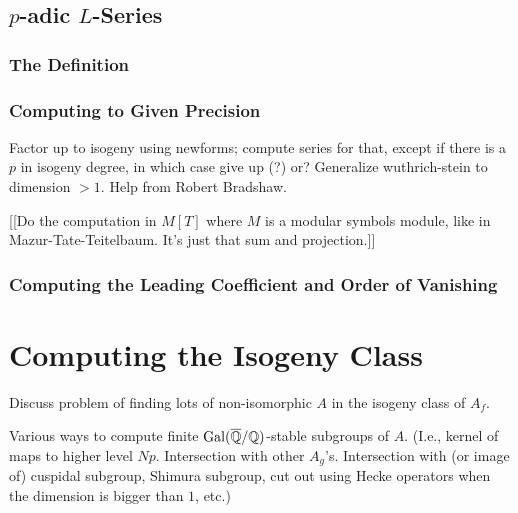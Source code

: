 \documentclass{article}
\begin{document}
\subsection{$p$-adic $L$-Series}


\subsubsection{The Definition}

\subsubsection{Computing to Given Precision}
Factor up to isogeny using newforms; compute series for that,
except if there is a $p$ in isogeny degree, in which case give up (?) or?
Generalize wuthrich-stein to dimension $>1$.  Help from Robert Bradshaw.

[[Do the computation in $M[T]$ where $M$ is a modular symbols module, like
in Mazur-Tate-Teitelbaum.  It's just that sum and projection.]]

\subsubsection{Computing the Leading Coefficient and Order of Vanishing}


\section{Computing the Isogeny Class}

Discuss problem of finding lots of non-isomorphic $A$ in the isogeny
class of $A_f$.

Various ways to compute finite $\operatorname{Gal}(\overline{\mathbb{Q}}/\mathbb{Q})$-stable subgroups of
$A$.  (I.e., kernel of maps to higher level $Np$.  Intersection with
other $A_g$'s.  Intersection with (or image of) cuspidal subgroup,
Shimura subgroup, cut out using Hecke operators when the dimension is
bigger than $1$, etc.)
\end{document}
